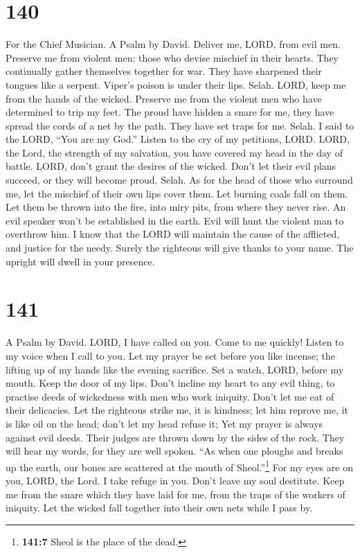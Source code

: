 \hypertarget{section-132}{%
\section{140}\label{section-132}}

For the Chief Musician. A Psalm by David.  Deliver me,
LORD, from evil men. Preserve me from violent men:  those
who devise mischief in their hearts. They continually gather themselves
together for war.  They have sharpened their tongues like
a serpent. Viper's poison is under their lips. Selah. 
LORD, keep me from the hands of the wicked. Preserve me from the violent
men who have determined to trip my feet.  The proud have
hidden a snare for me, they have spread the cords of a net by the path.
They have set traps for me. Selah.  I said to the LORD,
``You are my God.'' Listen to the cry of my petitions, LORD.
 LORD, the Lord, the strength of my salvation, you have
covered my head in the day of battle.  LORD, don't grant
the desires of the wicked. Don't let their evil plans succeed, or they
will become proud. Selah.  As for the head of those who
surround me, let the mischief of their own lips cover them.
 Let burning coals fall on them. Let them be thrown into
the fire, into miry pits, from where they never rise.  An
evil speaker won't be established in the earth. Evil will hunt the
violent man to overthrow him.  I know that the LORD will
maintain the cause of the afflicted, and justice for the needy.
 Surely the righteous will give thanks to your name. The
upright will dwell in your presence.

\hypertarget{section-133}{%
\section{141}\label{section-133}}

A Psalm by David.  LORD, I have called on you. Come to me
quickly! Listen to my voice when I call to you.  Let my
prayer be set before you like incense; the lifting up of my hands like
the evening sacrifice.  Set a watch, LORD, before my
mouth. Keep the door of my lips.  Don't incline my heart
to any evil thing, to practise deeds of wickedness with men who work
iniquity. Don't let me eat of their delicacies.  Let the
righteous strike me, it is kindness; let him reprove me, it is like oil
on the head; don't let my head refuse it; Yet my prayer is always
against evil deeds.  Their judges are thrown down by the
sides of the rock. They will hear my words, for they are well spoken.
 ``As when one ploughs and breaks up the earth, our bones
are scattered at the mouth of Sheol.''\footnote{\textbf{141:7} Sheol is
  the place of the dead.}  For my eyes are on you, LORD,
the Lord. I take refuge in you. Don't leave my soul destitute.
 Keep me from the snare which they have laid for me, from
the traps of the workers of iniquity.  Let the wicked
fall together into their own nets while I pass by.

